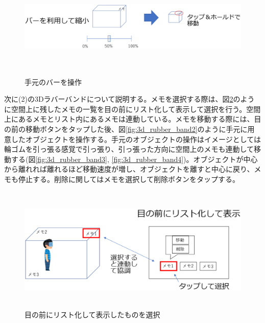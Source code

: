 \documentclass[11pt,a4j, titlepage]{jarticle} %
\begin{document}
\begin{figure}[H]
  \begin{center}
    \includegraphics[clip,height=5.0cm,width=17.0cm]{./shukusho_temoto.eps}
    \caption{手元のバーを操作}
    \label{fig:shukusho_temoto}
  \end{center}
\end{figure}

次に(2)の3Dラバーバンドについて説明する。メモを選択する際は、図\ref{fig:3d_rubber_band}のように空間上に残したメモの一覧を目の前にリスト化して表示して選択を行う。空間上にあるメモとリスト内にあるメモは連動している。メモを移動する際には、目の前の移動ボタンをタップした後、図\ref{fig:3d_rubber_band2}のように手元に用意したオブジェクトを操作する。手元のオブジェクトの操作はイメージとしては輪ゴムを引っ張る感覚で引っ張り、引っ張った方向に空間上のメモも連動して移動する(図\ref{fig:3d_rubber_band3}, \ref{fig:3d_rubber_band4})。オブジェクトが中心から離れれば離れるほど移動速度が増し、オブジェクトを離すと中心に戻り、メモも停止する。削除に関してはメモを選択して削除ボタンをタップする。

\begin{figure}[H]
  \begin{center}
    \includegraphics[clip,height=6.0cm,width=14.0cm]{./3d_rubber_band.eps}
    \caption{目の前にリスト化して表示したものを選択}
    \label{fig:3d_rubber_band}
  \end{center}
\end{figure}
\end{document}
